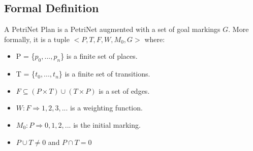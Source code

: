 \documentclass[pdftex,12pt,a4paper]{report}
\begin{document}
\subsection{Formal Definition}
A PetriNet Plan is a PetriNet augmented with a set of goal markings $G$.
More formally, it is a tuple $<P,T,F,W,M_0,G>$ where:
\begin{itemize}
\item P = \{$p_0, ... ,p_n$\} is a finite set of places.
\item T = \{$t_0, ... ,t_n$\} is a finite set of transitions.
\item $F \subseteq (P \times T) \cup (T \times P)$ is a set of edges.
\item $W: F \Rightarrow {1,2,3,...}$ is a weighting function.
\item $M_0: P \Rightarrow {0,1,2,...}$ is the initial marking.
\item $P \cup T \neq  0 $ and $P \cap T = 0$
\end{itemize} 
\end{document}
